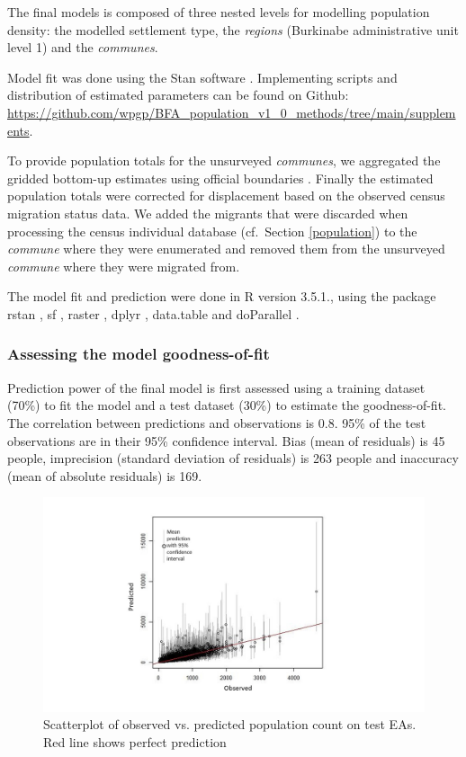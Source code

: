\documentclass[]{book}
\begin{document}
The final models is composed of three nested levels for modelling
population density: the modelled settlement type, the \emph{regions}
(Burkinabe administrative unit level 1) and the \emph{communes}.

Model fit was done using the Stan software \citep{carpenter2017stan}.
Implementing scripts and distribution of estimated parameters can be
found on Github:
\url{https://github.com/wpgp/BFA_population_v1_0_methods/tree/main/supplements}.

To provide population totals for the unsurveyed \emph{communes}, we
aggregated the gridded bottom-up estimates using official boundaries
\citep{institutgeographiqueduburkinafaso2015}. Finally the estimated
population totals were corrected for displacement based on the observed
census migration status data. We added the migrants that were discarded
when processing the census individual database (cf.~Section
\ref{population}) to the \emph{commune} where they were enumerated and
removed them from the unsurveyed \emph{commune} where they were migrated
from.

The model fit and prediction were done in R version 3.5.1., using the
package rstan \citep{stan2020rstan}, sf \citep{pebesma2020}, raster
\citep{hijmans2020}, dplyr \citep{wickham2020}, data.table
\citep{dowle2020} and doParallel \citep{wallig2020}.

\subsubsection{Assessing the model
goodness-of-fit}\label{assessing-the-model-goodness-of-fit}

Prediction power of the final model is first assessed using a training
dataset (70\%) to fit the model and a test dataset (30\%) to estimate
the goodness-of-fit. The correlation between predictions and
observations is 0.8. 95\% of the test observations are in their 95\%
confidence interval. Bias (mean of residuals) is 45 people, imprecision
(standard deviation of residuals) is 263 people and inaccuracy (mean of
absolute residuals) is 169.

\begin{figure}

{\centering \includegraphics[width=0.8\linewidth]{dat/BFAv1/predictions_scatterplot} 

}

\caption{Scatterplot of observed vs. predicted population count on test EAs. Red line shows perfect prediction}\label{fig:plot-pred}
\end{figure}
\end{document}
